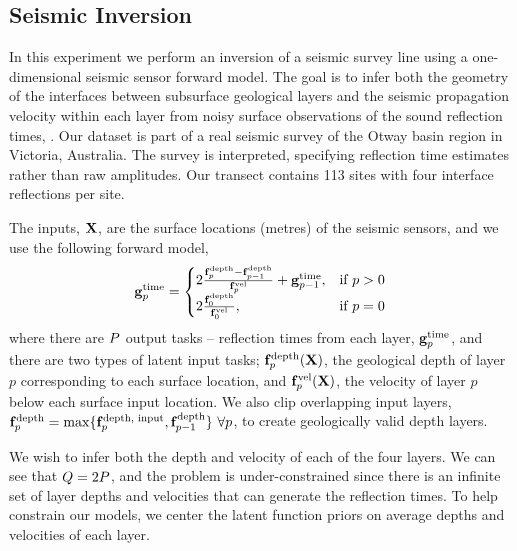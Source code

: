 \subsection{Seismic Inversion}

In this experiment we perform an inversion of a seismic survey line using a
one-dimensional seismic sensor forward model. The goal is to infer both the
geometry of the interfaces between subsurface geological layers and the
seismic propagation velocity within each layer from noisy surface observations
of the sound reflection times, \Outs. 
Our dataset is part of a real seismic survey of the Otway basin 
region in Victoria, Australia. The survey is interpreted, specifying reflection time
estimates rather than raw amplitudes. Our transect contains 113 sites with 
four interface reflections per site. 

The inputs, $\mathbf{X}$, are the surface locations (metres) of the seismic sensors,
and we use the following forward model,
\begin{equation}
    \mathbf{g}_p^\text{time} =
    \begin{cases}
        2\frac{\mathbf{f}_p^\text{depth} - \mathbf{f}_{p-1}^\text{depth}}
        {\mathbf{f}_p^\text{vel}} + \mathbf{g}_{p-1}^\text{time},
        & \text{if } p > 0 \\
        2\frac{\mathbf{f}_0^\text{depth}}{\mathbf{f}_0^\text{vel}},
        & \text{if } p = 0
    \end{cases}
\end{equation}
where there are $P$ output tasks -- reflection times from each layer,
$\mathbf{g}_p^\text{time}$, and there are two types of latent input tasks;
$\mathbf{f}_p^\text{depth}\!\left({\mathbf{X}}\right)$, the geological depth of layer $p$
corresponding to each surface location, and
$\mathbf{f}_p^\text{vel}\!\left({\mathbf{X}}\right)$, the velocity of layer $p$ below each
surface input location. We also clip overlapping input layers,
$\mathbf{f}_p^\text{depth} = \max\{\mathbf{f}_p^\text{depth, input},
\mathbf{f}_{p-1}^\text{depth}\}~\forall p$, to create geologically valid depth
layers.

We wish to infer both the depth and velocity of each of the four layers.  We
can see that $Q = 2P$, and the problem is under-constrained since
there is an infinite set of layer depths and velocities that can generate the
reflection times. To help constrain our models, we center the latent function
priors on average depths and velocities of each layer.

